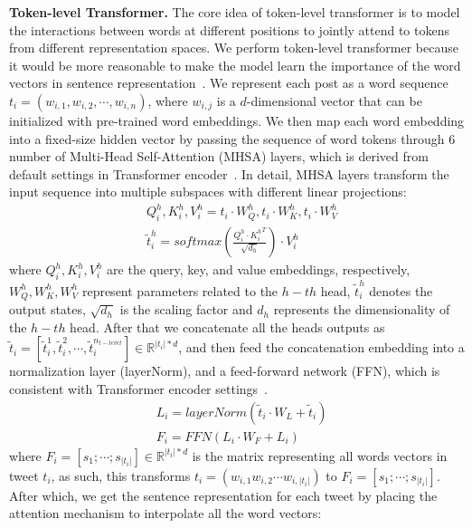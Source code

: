 \textbf{Token-level Transformer.}\label{sec:TokenTrans}
The core idea of token-level transformer is to model the interactions between words at different positions to jointly attend to tokens from different representation spaces. We perform token-level transformer because it would be more reasonable to make the model learn the importance of the word vectors in sentence representation~\cite{huang2021mixed}. We represent each post as a word sequence $t_i=(w_{i,1}, w_{i,2}, \cdots, w_{i,n})$, where $w_{i,j}$ is a $d$-dimensional vector that can be initialized with pre-trained word embeddings. We then map each word embedding into a fixed-size hidden vector by passing the sequence of word tokens through 6 number of Multi-Head Self-Attention (MHSA) layers, which is derived from default settings in Transformer encoder~\cite{vaswani2017attention}. In detail, MHSA layers transform the input sequence into multiple subspaces with different linear projections:
\begin{equation}\label{equ:Token-levelAtt}
\begin{split}
    & Q_i^h, K_i^h, V_i^h = t_i \cdot W_Q^h, t_i \cdot W_K^h, t_i \cdot W_V^h \\
    & \tilde{t}_i^h = softmax(\frac{Q_i^h \cdot {K_i^h}^T}{\sqrt{d_h}})\cdot V_i^h
\end{split}
\end{equation}
where $Q_i^h, K_i^h, V_i^h$ are the query, key, and value embeddings, respectively, $W_Q^h, W_K^h, W_V^h$ represent parameters related to the $h-th$ head, $\tilde{t}_i^h$ denotes the output states, $\sqrt{d_h}$ is the scaling factor and $d_h$ represents the dimensionality of the $h-th$ head. After that we concatenate all the heads outputs as $\tilde{t}_i = [\tilde{t}_i^1, \tilde{t}_i^2, \cdots, \tilde{t}_i^{n_{t-level}}] \in \mathbb{R}^{|t_i|*d}$, and then feed the concatenation embedding into a normalization layer (layerNorm), and a feed-forward network (FFN), which is consistent with Transformer encoder settings~\cite{vaswani2017attention}.
\begin{equation}\label{equ:layerNorm&FFN}
    \begin{split}
        & L_i = layerNorm(\tilde{t}_i \cdot W_L + \tilde{t}_i)\\
        & F_i = FFN(L_i \cdot W_F + L_i)
    \end{split}
\end{equation}
where $F_i=[s_1; \cdots; s_{|t_i|}] \in \mathbb{R}^{{|t_i|}*d}$ is the matrix representing all words vectors in tweet $t_i$, as such, this transforms $t_i=(w_{i,1} w_{i,2} \cdots w_{i,|t_i|})$ to $F_i=[s_1; \cdots; s_{|t_i|}]$. After which, we get the sentence representation for each tweet by placing the attention mechanism to interpolate all the word vectors:
